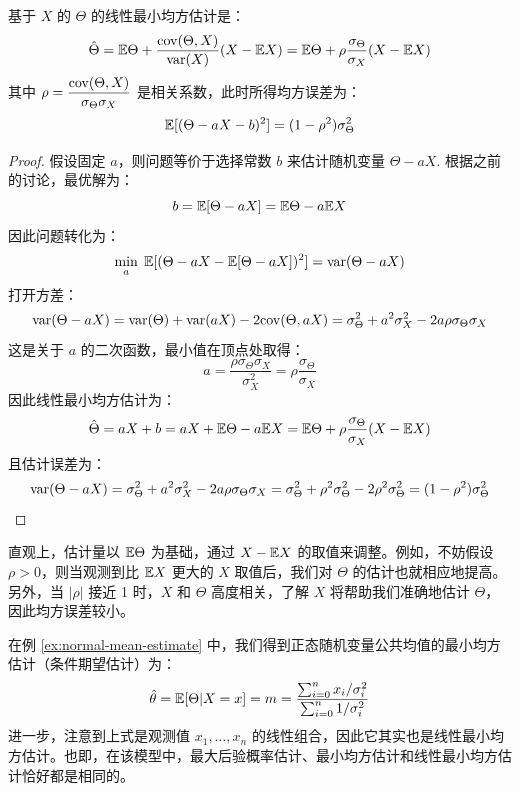\begin{theorem}[线性最小均方估计]
\label{thm:linear-lms-estimate}
基于 $X$ 的 $\Theta$ 的线性最小均方估计是：
\[
\hat\Theta=\mathbb{E}\Theta+\frac{\mathrm{cov}(\Theta,X)}{\mathrm{var}(X)}(X-\mathbb{E} X)=\mathbb{E}\Theta+\rho\frac{\sigma_\Theta}{\sigma_X}(X-\mathbb{E} X)
\]
其中 $\rho=\dfrac{\mathrm{cov}(\Theta,X)}{\sigma_\Theta\sigma_X}$ 是相关系数，此时所得均方误差为：
\[
\mathbb{E}[(\Theta-aX-b)^2]=(1-\rho^2)\sigma_\Theta^2
\]
\end{theorem}
\begin{proof}
假设固定 $a$，则问题等价于选择常数 $b$ 来估计随机变量 $\Theta-aX$. 根据之前的讨论，最优解为：
\[
b=\mathbb{E}[\Theta-aX]=\mathbb{E}\Theta-a\mathbb{E} X
\]
因此问题转化为：
\[
\min_a\;\mathbb{E}[(\Theta-aX-\mathbb{E}[\Theta-aX])^2]=\mathrm{var}(\Theta-aX)
\]
打开方差：
\[
\mathrm{var}(\Theta-aX)=\mathrm{var}(\Theta)+\mathrm{var}(aX)-2\mathrm{cov}(\Theta,aX)=\sigma_\Theta^2+a^2\sigma_X^2-2a\rho\sigma_\Theta\sigma_X
\]
这是关于 $a$ 的二次函数，最小值在顶点处取得：
\[
a=\frac{\rho\sigma_\Theta\sigma_X}{\sigma_X^2}=\rho\frac{\sigma_\Theta}{\sigma_X}
\]
因此线性最小均方估计为：
\[
\hat\Theta=aX+b=aX+\mathbb{E}\Theta-a\mathbb{E} X=\mathbb{E}\Theta+\rho\frac{\sigma_\Theta}{\sigma_X}(X-\mathbb{E} X)
\]
且估计误差为：
\[
\mathrm{var}(\Theta-aX)=\sigma_\Theta^2+a^2\sigma_X^2-2a\rho\sigma_\Theta\sigma_X=\sigma_\Theta^2+\rho^2\sigma_\Theta^2-2\rho^2\sigma_\Theta^2=(1-\rho^2)\sigma_\Theta^2
\]
\end{proof}
\begin{remark}
直观上，估计量以 $\mathbb{E}\Theta$ 为基础，通过 $X-\mathbb{E} X$ 的取值来调整。例如，不妨假设 $\rho>0$，则当观测到比 $\mathbb{E} X$ 更大的 $X$ 取值后，我们对 $\Theta$ 的估计也就相应地提高。另外，当 $|\rho|$ 接近 1 时，$X$ 和 $\Theta$ 高度相关，了解 $X$ 将帮助我们准确地估计 $\Theta$，因此均方误差较小。
\end{remark}

\begin{example}[正态随机变量公共均值的估计量-续]
在例 \ref{ex:normal-mean-estimate} 中，我们得到正态随机变量公共均值的最小均方估计（条件期望估计）为：
\[
\hat\theta=\mathbb{E}[\Theta\vert X=x]=m=\frac{\sum_{i=0}^nx_i/\sigma_i^2}{\sum_{i=0}^n1/\sigma_i^2}
\]
进一步，注意到上式是观测值 $x_1,\ldots,x_n$ 的线性组合，因此它其实也是线性最小均方估计。也即，在该模型中，最大后验概率估计、最小均方估计和线性最小均方估计恰好都是相同的。
\end{example}
